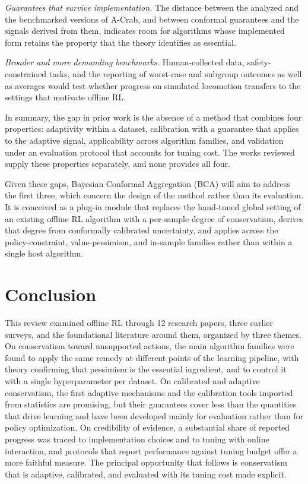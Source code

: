 \documentclass[journal]{IEEEtran}
\begin{document}
\emph{Guarantees that survive implementation.} The distance between the analyzed and the benchmarked versions of A-Crab, and between conformal guarantees and the signals derived from them, indicates room for algorithms whose implemented form retains the property that the theory identifies as essential.

\emph{Broader and more demanding benchmarks.} Human-collected data, safety-constrained tasks, and the reporting of worst-case and subgroup outcomes as well as averages would test whether progress on simulated locomotion transfers to the settings that motivate offline RL.

In summary, the gap in prior work is the absence of a method that combines four properties: adaptivity within a dataset, calibration with a guarantee that applies to the adaptive signal, applicability across algorithm families, and validation under an evaluation protocol that accounts for tuning cost. The works reviewed supply these properties separately, and none provides all four.

Given these gaps, Bayesian Conformal Aggregation (BCA) will aim to address the first three, which concern the design of the method rather than its evaluation. It is conceived as a plug-in module that replaces the hand-tuned global setting of an existing offline RL algorithm with a per-sample degree of conservatism, derives that degree from conformally calibrated uncertainty, and applies across the policy-constraint, value-pessimism, and in-sample families rather than within a single host algorithm.

\section{Conclusion}
\label{sec:conclusion}
This review examined offline RL through 12 research papers, three earlier surveys, and the foundational literature around them, organized by three themes. On conservatism toward unsupported actions, the main algorithm families were found to apply the same remedy at different points of the learning pipeline, with theory confirming that pessimism is the essential ingredient, and to control it with a single hyperparameter per dataset. On calibrated and adaptive conservatism, the first adaptive mechanisms and the calibration tools imported from statistics are promising, but their guarantees cover less than the quantities that drive learning and have been developed mainly for evaluation rather than for policy optimization. On credibility of evidence, a substantial share of reported progress was traced to implementation choices and to tuning with online interaction, and protocols that report performance against tuning budget offer a more faithful measure. The principal opportunity that follows is conservatism that is adaptive, calibrated, and evaluated with its tuning cost made explicit.
\end{document}
